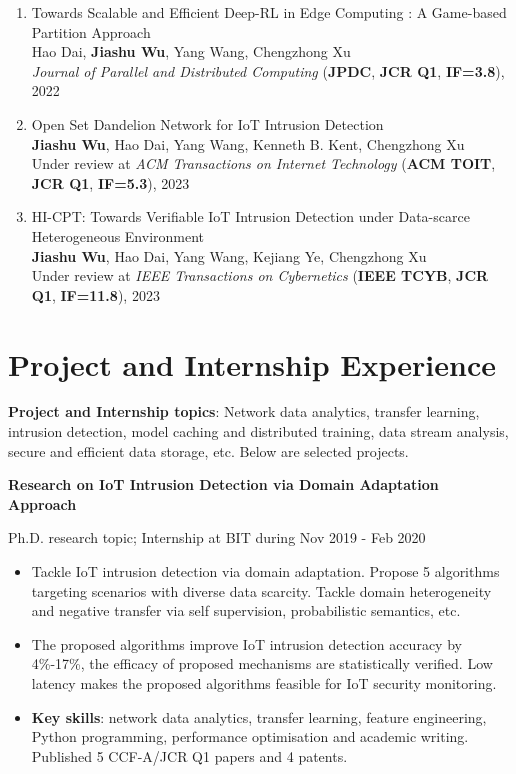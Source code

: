\documentclass[letterpaper,10.9pt]{article}
\begin{document}
\begin{enumerate}
  \item Towards Scalable and Efficient Deep-RL in Edge Computing : A Game-based Partition Approach\\
  Hao Dai, \textbf{Jiashu Wu}, Yang Wang\textsuperscript{\Letter}, Chengzhong Xu\\
  \textit{Journal of Parallel and Distributed Computing} (\textbf{JPDC}, \textbf{JCR Q1}, \textbf{IF=3.8}), 2022

  \item Open Set Dandelion Network for IoT Intrusion Detection\\
  \textbf{Jiashu Wu}, Hao Dai, Yang Wang\textsuperscript{\Letter}, Kenneth B. Kent, Chengzhong Xu\\
  Under review at \textit{ACM Transactions on Internet Technology} (\textbf{ACM TOIT}, \textbf{JCR Q1}, \textbf{IF=5.3}), 2023

  \item HI-CPT: Towards Verifiable IoT Intrusion Detection under Data-scarce Heterogeneous Environment\\
  \textbf{Jiashu Wu}, Hao Dai, Yang Wang\textsuperscript{\Letter}, Kejiang Ye, Chengzhong Xu\\
  Under review at \textit{IEEE Transactions on Cybernetics} (\textbf{IEEE TCYB}, \textbf{JCR Q1}, \textbf{IF=11.8}), 2023
\end{enumerate}




\section{\textbf{Project and Internship Experience}}

\textbf{Project and Internship topics}: Network data analytics, transfer learning, intrusion detection, model caching and distributed training, data stream analysis, secure and efficient data storage, etc. Below are selected projects. 

\vspace{2mm}

\textbf{Research on IoT Intrusion Detection via Domain Adaptation Approach}

Ph.D. research topic; Internship at BIT during Nov 2019 - Feb 2020

\begin{itemize}
  \setlength\itemsep{1.8pt}
  \item Tackle IoT intrusion detection via domain adaptation. Propose 5 algorithms targeting scenarios with diverse data scarcity. Tackle domain heterogeneity and negative transfer via self supervision, probabilistic semantics, etc. 
  \item The proposed algorithms improve IoT intrusion detection accuracy by 4\%-17\%, the efficacy of proposed mechanisms are statistically verified. Low latency makes the proposed algorithms feasible for IoT security monitoring. 
  \item \textbf{Key skills}: network data analytics, transfer learning, feature engineering, Python programming, performance optimisation and academic writing. Published 5 CCF-A/JCR Q1 papers and 4 patents. 
\end{itemize}
\end{document}
